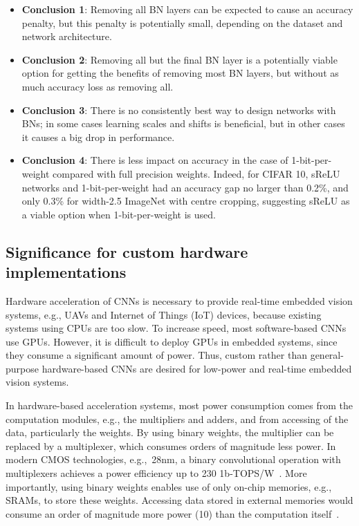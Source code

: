 \documentclass[conference]{IEEEtran}
\begin{document}
\begin{itemize}
    \item {\bf Conclusion 1}: Removing all BN layers can be expected to cause an accuracy penalty, but this penalty is potentially small, depending on the dataset and network architecture.
    \item {\bf Conclusion 2}: Removing all but the final BN layer is a potentially viable option for getting the benefits of removing most BN layers, but without as much accuracy loss as removing all.
    \item {\bf Conclusion 3}: There is no consistently best way to design networks with BNs; in some cases learning scales and shifts is beneficial, but in other cases it causes a big drop in performance.
     \item {\bf Conclusion 4}: There is less impact on accuracy in the case of 1-bit-per-weight compared with full precision weights. Indeed, for CIFAR 10, sReLU networks and 1-bit-per-weight had an accuracy gap no larger than 0.2\%, and only 0.3\% for width-2.5 ImageNet with centre cropping, suggesting sReLU as a viable option when 1-bit-per-weight is used.
\end{itemize}

\subsection{Significance for custom hardware implementations}

Hardware acceleration of CNNs is necessary to provide real-time embedded vision systems, e.g., UAVs and Internet of Things (IoT) devices, because existing systems using CPUs are too slow. To increase speed, most software-based CNNs use GPUs. However, it is difficult to deploy GPUs in embedded systems, since they consume a significant amount of power. Thus, custom rather than general-purpose hardware-based CNNs are desired for low-power and real-time embedded vision systems. 
 
In hardware-based acceleration systems, most power consumption comes from the computation modules, e.g., the multipliers and adders, and from  accessing of the data, particularly the weights. By using binary weights, the multiplier can be replaced by a multiplexer, which consumes orders of magnitude less power. In modern CMOS technologies, e.g.,~28nm, a binary convolutional operation with multiplexers achieves a power efficiency up to 230 1b-TOPS/W~\cite{Moons.18}. More importantly, using binary weights enables use of only on-chip memories, e.g., SRAMs, to store these weights. Accessing data stored in external memories would consume an order of magnitude more power (10) than the computation itself~\cite{Chen.16}. 
 
\end{document}
